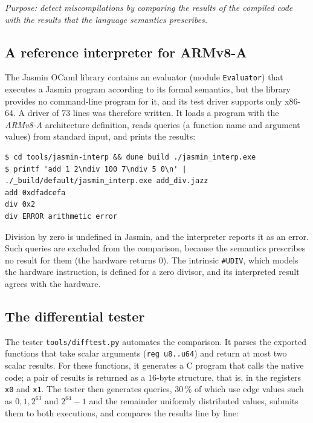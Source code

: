 \documentclass[11pt,a4paper]{article}
\newcommand{\file}[1]{\texttt{#1}}
\begin{document}
\emph{Purpose: detect miscompilations by comparing the results of the
compiled code with the results that the language semantics prescribes.}

\subsection{A reference interpreter for ARMv8-A}

The Jasmin OCaml library contains an evaluator (module \texttt{Evaluator})
that executes a Jasmin program according to its formal semantics, but the
library provides no command-line program for it, and its test driver
supports only x86-64. A driver of 73 lines was therefore written. It loads a
program with the \emph{ARMv8-A} architecture definition, reads queries (a
function name and argument values) from standard input, and prints the
results:



\begin{lstlisting}[style=shell]
$ cd tools/jasmin-interp && dune build ./jasmin_interp.exe
$ printf 'add 1 2\ndiv 100 7\ndiv 5 0\n' | ./_build/default/jasmin_interp.exe add_div.jazz
add 0xdfadcefa
div 0x2
div ERROR arithmetic error
\end{lstlisting}

Division by zero is undefined in Jasmin, and the interpreter reports it as
an error. Such queries are excluded from the comparison, because the
semantics prescribes no result for them (the hardware returns 0). The
intrinsic \texttt{\#UDIV}, which models the hardware instruction, is defined
for a zero divisor, and its interpreted result agrees with the hardware.

\subsection{The differential tester}

The tester \file{tools/difftest.py} automates the comparison. It parses the
exported functions that take scalar arguments (\texttt{reg u8..u64}) and
return at most two scalar results. For these functions, it generates a C
program that calls the native code; a pair of results is returned as a
16-byte structure, that is, in the registers \texttt{x0} and \texttt{x1}.
The tester then generates queries, 30\,\% of which use edge values such as
$0, 1, 2^{63}$ and $2^{64}-1$ and the remainder uniformly distributed values,
submits them to both executions, and compares the results line by line:
\end{document}
